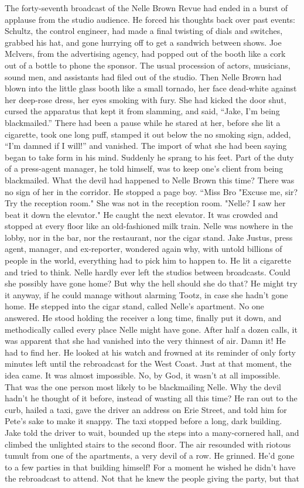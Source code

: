 \documentclass{novel}
\begin{document}
The forty-seventh broadcast of the Nelle Brown Revue had ended in a burst of applause from the studio audience. He forced his thoughts back over past events: Schultz, the control engineer, had made a final twisting of dials and switches, grabbed his hat, and gone hurrying off to get a sandwich between shows. Joe Mclvers, from the advertising agency, had popped out of the booth like a cork out of a bottle to phone the sponsor. The usual procession of actors, musicians, sound men, and assistants had filed out of the studio. Then Nelle Brown had blown into the little glass booth like a small tornado, her face dead-white against her deep-rose dress, her eyes smoking with fury. She had kicked the door shut, cursed the apparatus that kept it from slamming, and said, “Jake, I’m being blackmailed.” There had been a pause while he stared at her, before she lit a cigarette, took one long puff, stamped it out below the no smoking sign, added, “I’m damned if I will!” and vanished. The import of what she had been saying began to take form in his mind. Suddenly he sprang to his feet. Part of the duty of a press-agent manager, he told himself, was to keep one’s client from being blackmailed. What the devil had happened to Nelle Brown this time? There was no sign of her in the corridor. He stopped a page boy. “Miss Bro "Excuse me, sir? Try the reception room." She was not in the reception room. "Nelle? I saw her beat it down the elevator." He caught the next elevator. It was crowded and stopped at every floor like an old-fashioned milk train. Nelle was nowhere in the lobby, nor in the bar, nor the restaurant, nor the cigar stand. Jake Justus, press agent, manager, and ex-reporter, wondered again why, with untold billions of people in the world, everything had to pick him to happen to. He lit a cigarette and tried to think. Nelle hardly ever left the studios between broadcasts. Could she possibly have gone home? But why the hell should she do that? He might try it anyway, if he could manage without alarming Tootz, in case she hadn't gone home. He stepped into the cigar stand, called Nelle's apartment. No one answered. He stood holding the receiver a long time, finally put it down, and methodically called every place Nelle might have gone. After half a dozen calls, it was apparent that she had vanished into the very thinnest of air. Damn it! He had to find her. He looked at his watch and frowned at its reminder of only forty minutes left until the rebroadcast for the West Coast. Just at that moment, the idea came. It was almost impossible. No, by God, it wasn't at all impossible. That was the one person most likely to be blackmailing Nelle. Why the devil hadn't he thought of it before, instead of wasting all this time? He ran out to the curb, hailed a taxi, gave the driver an address on Erie Street, and told him for Pete's sake to make it snappy. The taxi stopped before a long, dark building. Jake told the driver to wait, bounded up the steps into a many-cornered hall, and climbed the unlighted stairs to the second floor. The air resounded with riotous tumult from one of the apartments, a very devil of a row. He grinned. He'd gone to a few parties in that building himself! For a moment he wished he didn't have the rebroadcast to attend. Not that he knew the people giving the party, but that 
\end{document}

